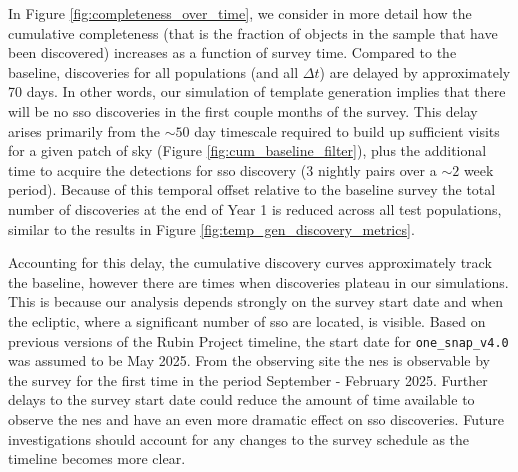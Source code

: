 \documentclass[preprintm,linenumbers]{aastex631}
\newcommand{\baseline}{\texttt{one\_snap\_v4.0}\xspace}
\begin{document}
		In Figure \ref{fig:completeness_over_time}, we consider in more detail how the cumulative completeness (that is the fraction of objects in the sample that have been discovered) increases as a function of survey time.
  Compared to the baseline, discoveries for all populations (and all $\Delta t$) are delayed by approximately 70 days.
  In other words, our simulation of template generation implies that there will be no \gls*{sso} discoveries in the first couple months of the survey.
  This delay arises primarily from the $\sim 50$ day timescale required to build up sufficient visits for a given patch of sky (Figure \ref{fig:cum_baseline_filter}), plus the additional time to acquire the detections for \gls*{sso} discovery (3 nightly pairs over a $\sim 2$ week period).
  Because of this temporal offset relative to the baseline survey the total number of discoveries at the end of Year 1 is reduced across all test populations, similar to the results in Figure \ref{fig:temp_gen_discovery_metrics}.
  
Accounting for this delay, the cumulative discovery curves approximately track the baseline, however there are times when discoveries plateau in our simulations.
This is because our analysis depends strongly on the survey start date and when the ecliptic, where a significant number of \gls*{sso} are located, is visible. 
Based on previous versions of the Rubin Project timeline, the start date for \baseline was assumed to be May 2025.
From the observing site the \gls*{nes} is observable by the survey for the first time in the period September - February 2025. 
Further delays to the survey start date could reduce the amount of time available to observe the \gls*{nes} and have an even more dramatic effect on \gls*{sso} discoveries.
Future investigations should account for any changes to the survey schedule as the timeline becomes more clear.
		
\end{document}
